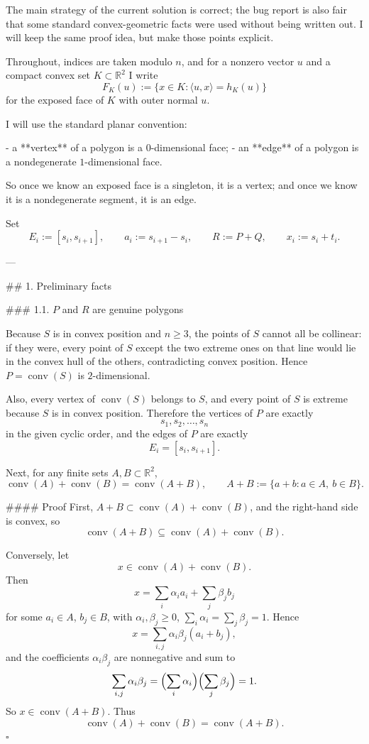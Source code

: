 The main strategy of the current solution is correct; the bug report is also fair that some standard convex-geometric facts were used without being written out. I will keep the same proof idea, but make those points explicit.

Throughout, indices are taken modulo \(n\), and for a nonzero vector \(u\) and a compact convex set \(K\subset \mathbb R^2\) I write
\[
F_K(u):=\{x\in K:\langle u,x\rangle=h_K(u)\}
\]
for the exposed face of \(K\) with outer normal \(u\).

I will use the standard planar convention:

- a **vertex** of a polygon is a \(0\)-dimensional face;
- an **edge** of a polygon is a nondegenerate \(1\)-dimensional face.

So once we know an exposed face is a singleton, it is a vertex; and once we know it is a nondegenerate segment, it is an edge.

Set
\[
E_i:=[s_i,s_{i+1}],\qquad a_i:=s_{i+1}-s_i,\qquad R:=P+Q,\qquad x_i:=s_i+t_i .
\]

---

## 1. Preliminary facts

### 1.1. \(P\) and \(R\) are genuine polygons

Because \(S\) is in convex position and \(n\ge 3\), the points of \(S\) cannot all be collinear: if they were, every point of \(S\) except the two extreme ones on that line would lie in the convex hull of the others, contradicting convex position. Hence \(P=\operatorname{conv}(S)\) is \(2\)-dimensional.

Also, every vertex of \(\operatorname{conv}(S)\) belongs to \(S\), and every point of \(S\) is extreme because \(S\) is in convex position. Therefore the vertices of \(P\) are exactly
\[
s_1,s_2,\dots,s_n
\]
in the given cyclic order, and the edges of \(P\) are exactly
\[
E_i=[s_i,s_{i+1}].
\]

Next, for any finite sets \(A,B\subset \mathbb R^2\),
\[
\operatorname{conv}(A)+\operatorname{conv}(B)=\operatorname{conv}(A+B),
\qquad A+B:=\{a+b:a\in A,\ b\in B\}.
\]

#### Proof
First, \(A+B\subset \operatorname{conv}(A)+\operatorname{conv}(B)\), and the right-hand side is convex, so
\[
\operatorname{conv}(A+B)\subseteq \operatorname{conv}(A)+\operatorname{conv}(B).
\]

Conversely, let
\[
x\in \operatorname{conv}(A)+\operatorname{conv}(B).
\]
Then
\[
x=\sum_i \alpha_i a_i+\sum_j \beta_j b_j
\]
for some \(a_i\in A\), \(b_j\in B\), with \(\alpha_i,\beta_j\ge 0\), \(\sum_i\alpha_i=\sum_j\beta_j=1\). Hence
\[
x=\sum_{i,j}\alpha_i\beta_j(a_i+b_j),
\]
and the coefficients \(\alpha_i\beta_j\) are nonnegative and sum to
\[
\sum_{i,j}\alpha_i\beta_j=\Bigl(\sum_i\alpha_i\Bigr)\Bigl(\sum_j\beta_j\Bigr)=1.
\]
So \(x\in \operatorname{conv}(A+B)\). Thus
\[
\operatorname{conv}(A)+\operatorname{conv}(B)=\operatorname{conv}(A+B).
\]
\(\square\)

